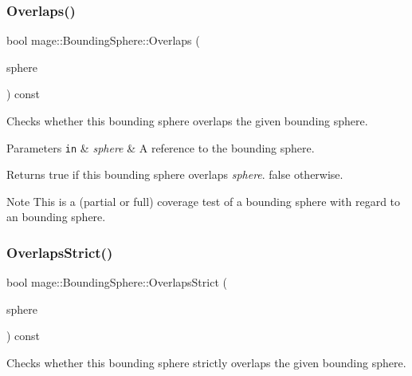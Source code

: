 \subsubsection{\texorpdfstring{Overlaps()}{Overlaps()}}
{\footnotesize\ttfamily bool mage\+::\+Bounding\+Sphere\+::\+Overlaps (\begin{DoxyParamCaption}\item[{const \mbox{\hyperlink{classmage_1_1_bounding_sphere}{Bounding\+Sphere}} \&}]{sphere }\end{DoxyParamCaption}) const\hspace{0.3cm}{\ttfamily [noexcept]}}

Checks whether this bounding sphere overlaps the given bounding sphere.


\begin{DoxyParams}[1]{Parameters}
\mbox{\tt in}  & {\em sphere} & A reference to the bounding sphere. \\
\hline
\end{DoxyParams}
\begin{DoxyReturn}{Returns}
{\ttfamily true} if this bounding sphere overlaps {\itshape sphere}. {\ttfamily false} otherwise. 
\end{DoxyReturn}
\begin{DoxyNote}{Note}
This is a (partial or full) coverage test of a bounding sphere with regard to an bounding sphere. 
\end{DoxyNote}
\mbox{\label{classmage_1_1_bounding_sphere_a352314bd02664521a516ac5d0ce4a5a4}} 
\subsubsection{\texorpdfstring{Overlaps\+Strict()}{OverlapsStrict()}}
{\footnotesize\ttfamily bool mage\+::\+Bounding\+Sphere\+::\+Overlaps\+Strict (\begin{DoxyParamCaption}\item[{const \mbox{\hyperlink{classmage_1_1_bounding_sphere}{Bounding\+Sphere}} \&}]{sphere }\end{DoxyParamCaption}) const\hspace{0.3cm}{\ttfamily [noexcept]}}

Checks whether this bounding sphere strictly overlaps the given bounding sphere.



